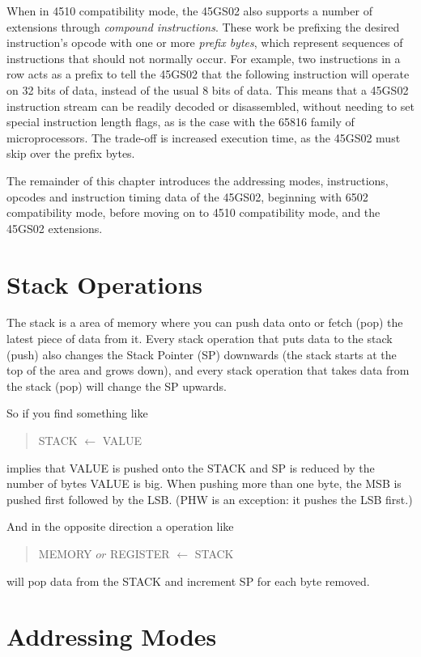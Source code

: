 When in 4510 compatibility mode, the 45GS02 also supports a number
of extensions through {\em compound instructions}. These work be prefixing
the desired instruction's opcode with one or more {\em prefix bytes}, which
represent sequences of instructions that should not normally occur.  For example,
two  instructions in a row acts as a prefix to tell the 45GS02 that the
following instruction will operate on 32 bits of data, instead of the usual 8 bits
of data.  This means that a 45GS02 instruction stream can be readily decoded or disassembled,
without needing to set special instruction length flags, as is the case with the 65816
family of microprocessors. The trade-off is increased execution time, as the 45GS02 must
skip over the prefix bytes.

The remainder of this chapter introduces the addressing modes, instructions, opcodes and
instruction timing data of the 45GS02, beginning with 6502 compatibility mode, before
moving on to 4510 compatibility mode, and the 45GS02 extensions.

\section{Stack Operations}

The stack is a area of memory where you can push data onto or fetch (pop) the latest piece
of data from it. Every stack operation that puts data to the stack (push) also changes the Stack
Pointer (SP) downwards (the stack starts at the top of the area and grows down), and every
stack operation that takes data from the stack (pop) will change the SP upwards.

So if you find something like
\begin{quote}
  STACK $\leftarrow$ VALUE
\end{quote}
implies that VALUE is pushed onto the STACK and SP is reduced by the number of bytes VALUE is
big. When pushing more than one byte, the MSB is pushed first followed by the LSB. (PHW is an exception: it pushes the LSB first.)

And in the opposite direction a operation like
\begin{quote}
  MEMORY $or$ REGISTER $\leftarrow$ STACK
\end{quote}
will pop data from the STACK and increment SP for each byte removed.

\section{Addressing Modes}
\label{sec:addressing-modes}

